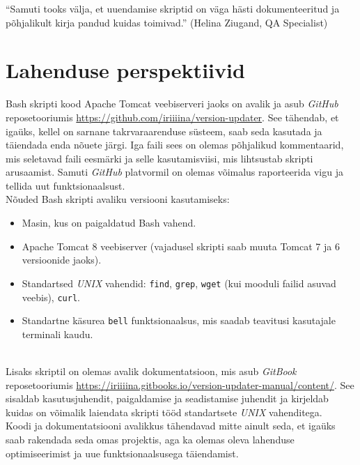 \documentclass[12pt]{report}
\newcommand{\code}[1]{\texttt{#1}}
\begin{document}
    \begin{displayquote}
    ``Samuti tooks välja, et uuendamise skriptid on väga hästi dokumenteeritud ja põhjalikult kirja pandud kuidas toimivad.'' (Helina Ziugand, QA Specialist)
    \end{displayquote}

  \newpage
  
  \section{Lahenduse perspektiivid}
  
  Bash skripti kood Apache Tomcat veebiserveri jaoks on avalik ja asub \textit{GitHub} reposetooriumis \url{https://github.com/iriiiina/version-updater}. See tähendab, et igaüks, kellel on sarnane takrvaraarenduse süsteem, saab seda kasutada ja täiendada enda nõuete järgi. Iga faili sees on olemas põhjalikud kommentaarid, mis seletavad faili eesmärki ja selle kasutamisviisi, mis lihtsustab skripti arusaamist. Samuti \textit{GitHub} platvormil on olemas võimalus raporteerida vigu ja tellida uut funktsionaalsust.\\
  
  Nõuded Bash skripti avaliku versiooni kasutamiseks:
  \begin{itemize}
    \item Masin, kus on paigaldatud Bash vahend.
    \item Apache Tomcat 8 veebiserver (vajadusel skripti saab muuta Tomcat 7 ja 6 versioonide jaoks).
    \item Standartsed \textit{UNIX} vahendid: \code{find}, \code{grep}, \code{wget} (kui mooduli failid asuvad veebis), \code{curl}.
    \item Standartne käsurea \code{bell} funktsionaalsus, mis saadab teavitusi kasutajale terminali kaudu.
  \end{itemize}\\
  
  Lisaks skriptil on olemas avalik dokumentatsioon, mis asub \textit{GitBook} reposetooriumis \url{https://iriiiina.gitbooks.io/version-updater-manual/content/}. See sisaldab kasutusjuhendit, paigaldamise ja seadistamise juhendit ja kirjeldab kuidas on võimalik laiendata skripti tööd standartsete \textit{UNIX} vahenditega.\\
  
  Koodi ja dokumentatsiooni avalikkus tähendavad mitte ainult seda, et igaüks saab rakendada seda omas projektis, aga ka olemas oleva lahenduse optimiseerimist ja uue funktsionaalsusega täiendamist.
  
\end{document}
